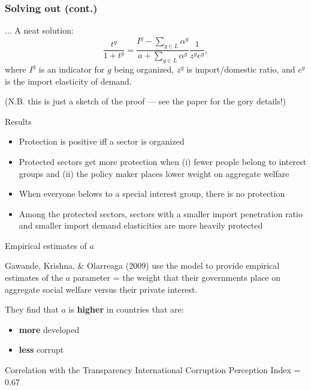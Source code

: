 \documentclass[11pt,aspectratio=169]{beamer}
\begin{document}
\begin{frame}

\frametitle{Solving out (cont.)}
... A neat solution: $$\frac{t^g}{1+t^g} = \frac{I^g-\sum_{g\in L} \alpha^g}{a + \sum_{g\in L} \alpha^g} \frac{1}{z^ge^g},$$ where $I^g$ is an indicator for $g$ being organized, $z^g$ is import/domestic ratio, and $e^g$ is the import elasticity of demand. 


(N.B. this is just a sketch of the proof — see the paper for the gory details!)





\end{frame}

\begin{frame}{Results}

\begin{itemize}


\item Protection is positive iff a sector is organized 
\item Protected sectors get more protection when (i) fewer people belong to interest groups and (ii) the policy maker places lower weight on aggregate welfare
\item When everyone belows to a special interest group, there is no protection
\item Among the protected sectors, sectors with a smaller import penetration ratio and smaller import demand elasticities are more heavily protected

\end{itemize}


\end{frame}

\begin{frame}{Empirical estimates of $a$}

Gawande, Krishna, \& Olarreaga (2009) use the model to provide empirical estimates of the $a$ parameter = the weight that their governments place on aggregate social welfare versus their private interest.

\pause

They find that $a$ is \textbf{higher} in countries that are:

\begin{itemize}
\item \textbf{more} developed
\item \textbf{less} corrupt
\end{itemize}

\pause 
Correlation with the Transparency International Corruption Perception Index = 0.67

\end{frame}
\end{document}
